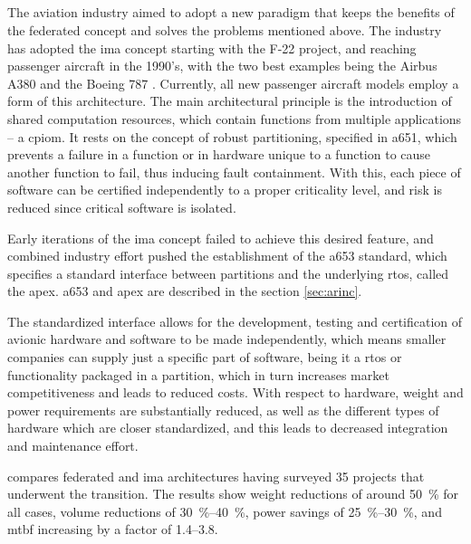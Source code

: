 \documentclass[main.tex]{subfiles}
\begin{document}
\subsection{}

The aviation industry aimed to adopt a new paradigm that keeps the benefits of the federated concept and solves the problems mentioned above.
The industry has adopted the \gls{ima} concept starting with the F-22 project, and reaching passenger aircraft in the 1990's, with the two best examples being the Airbus A380 and the Boeing 787 \cite{gaska2015integrated}.
Currently, all new passenger aircraft models employ a form of this architecture.
The main architectural principle is the introduction of shared computation resources, which contain functions from multiple applications -- a \gls{cpiom}.
It rests on the concept of robust partitioning, specified in \gls{a651}, which prevents a failure in a function or in hardware unique to a function to cause another function to fail, thus inducing fault containment.
With this, each piece of software can be certified independently to a proper criticality level, and risk is reduced since critical software is isolated.

Early iterations of the \gls{ima} concept failed to achieve this desired feature, and combined industry effort pushed the establishment of the \gls{a653} standard, which specifies a standard interface between partitions and the underlying \gls{rtos}, called the \gls{apex}.
\gls{a653} and \gls{apex} are described in the section \ref{sec:arinc}.

The standardized interface allows for the development, testing and certification of avionic hardware and software to be made independently, which means smaller companies can supply just a specific part of software, being it a \gls{rtos} or functionality packaged in a partition, which in turn increases market competitiveness and leads to reduced costs.
With respect to hardware, weight and power requirements are substantially reduced, as well as the different types of hardware which are closer standardized, and this leads to decreased integration and maintenance effort. 

\Textcite{mairaj2015preferred} compares federated and \gls{ima} architectures having surveyed 35 projects that underwent the transition.
The results show weight reductions of around \SI{50}{\percent} for all cases, volume reductions of \SIrange{30}{40}{\percent}, power savings of \SIrange{25}{30}{\percent}, and \gls{mtbf} increasing by a factor of \numrange{1.4}{3.8}.
\end{document}
